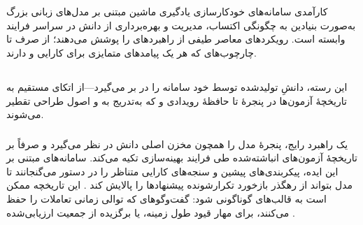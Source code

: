 \section[تحلیل منابع دانش]{}

کارآمدی سامانه‌های خودکارسازی یادگیری ماشین مبتنی بر مدل‌های زبانی بزرگ به‌صورت بنیادین به چگونگی اکتساب، مدیریت و بهره‌برداری از دانش در سراسر فرایند  وابسته است. رویکردهای معاصر طیفی از راهبردهای  را پوشش می‌دهند؛ از  صرف تا چارچوب‌های  که هر یک پیامدهای متمایزی برای کارایی  و  دارند.

\subsection[دانش درونی: تاریخچهٔ آزمون و بازتاب]{}
این رسته، دانشِ تولیدشده توسط خود سامانه را در بر می‌گیرد—از اتکای مستقیم به تاریخچهٔ آزمون‌ها در پنجرهٔ  تا حافظهٔ رویدادی و  که به‌تدریج به  و اصول طراحی تقطیر می‌شوند.

\subsubsection{\protect{}}

یک راهبرد رایج، پنجرهٔ  مدل را همچون مخزن اصلی دانش در نظر می‌گیرد و صرفاً بر تاریخچهٔ آزمون‌های انباشته‌شده طی فرایند بهینه‌سازی تکیه می‌کند. سامانه‌های مبتنی بر این ایده، پیکربندی‌های پیشین و سنجه‌های کارایی متناظر را در دستور می‌گنجانند تا مدل بتواند از رهگذر بازخورد تکرارشونده پیشنهادها را پالایش کند \cite{zhang2023usingLLMforHPO, zheng2023GENIUS, liu2024LLAMBO}. این تاریخچه ممکن است به قالب‌های گوناگونی  شود: گفت‌وگوهای  که توالی زمانی تعاملات را حفظ می‌کنند،  برای مهار قیود طول زمینه، یا  برگزیده از جمعیت ارزیابی‌شده \cite{zhang2023usingLLMforHPO, chen2023Evoprompting}.

